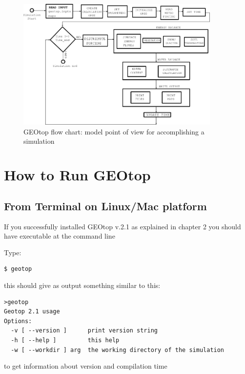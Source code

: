 \begin{figure}[t]
\centering
\includegraphics[width=0.9\textwidth]{./images/pic_flowchart/SCHEMAii.png}
\caption{GEOtop flow chart: model point of view for accomplishing a simulation}
\label{Fig_sim_flowchart2}
\end{figure}


\newpage
\section{How to Run GEOtop}
\subsection{From Terminal  on Linux/Mac platform}

\noindent  If you successfully installed GEOtop v.2.1 as explained in chapter 2 you should have executable at the command line 


\noindent Type:

\footnotesize{
\begin{verbatim}
$ geotop  
\end{verbatim}
}



\noindent this should give as output something similar to this:


\footnotesize{
\begin{verbatim}
>geotop
Geotop 2.1 usage
Options:
  -v [ --version ]      print version string
  -h [ --help ]         this help
  -w [ --workdir ] arg  the working directory of the simulation

\end{verbatim}
}
 
\noindent to get information about version and compilation time

